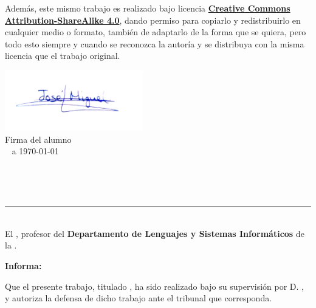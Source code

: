 \bigskip
Además, este mismo trabajo es realizado bajo licencia \href{https://creativecommons.org/licenses/by-sa/4.0/}{\textbf{Creative Commons Attribution-ShareAlike 4.0}}, dando permiso para copiarlo y redistribuirlo en cualquier medio o formato, también de adaptarlo de la forma que se quiera, pero todo esto siempre y cuando se reconozca la autoría y se distribuya con la misma licencia que el trabajo original. 


\vspace{3cm}

\begin{center}
\includegraphics[width=0.45\textwidth]{../images/firmaJM.jpg}\\

Firma del alumno\\

\ciudad ~ a \today\\
\end{center}





\newpage
\begin{center}
{\LARGE\bfseries\titulo}\\
\end{center}
\begin{center}
\autor\
\end{center}
\noindent\rule[-1ex]{\textwidth}{2pt}\\[4.5ex]


El \textbf{\tutor}, profesor del \textbf{Departamento de Lenguajes y Sistemas Informáticos} de la \textbf{\universidad}.

\vspace{0.5cm}

\vspace{0.5cm}

\textbf{Informa:}

\vspace{0.5cm}

Que el presente trabajo, titulado \textit{\textbf{\titulo}},
ha sido realizado bajo su supervisión por D. \textbf{\autor}, y autoriza la defensa de dicho trabajo ante el tribunal
que corresponda.

\vspace{0.5cm}

